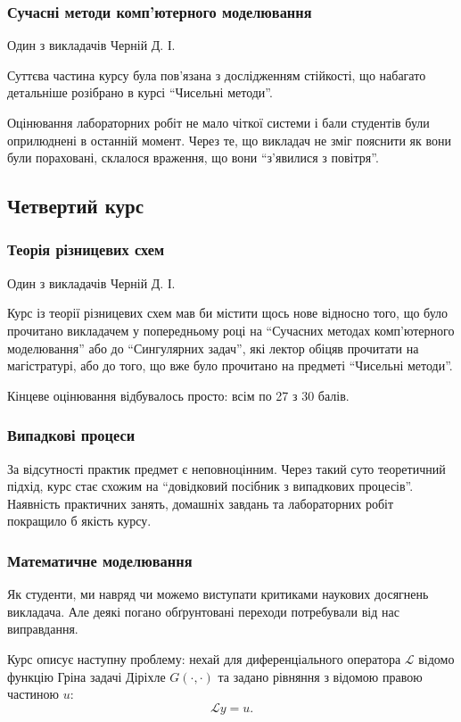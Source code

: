 \documentclass[14pt, a4paper]{extarticle}  %
\begin{document}
\subsubsection{Сучасні методи комп'ютерного моделювання}
Один з викладачів Черній Д. І.

Суттєва частина курсу була пов'язана з дослідженням стійкості, що набагато детальніше розібрано в курсі ``Чисельні методи''.

Оцінювання лабораторних робіт не мало чіткої системи і бали студентів були оприлюднені в останній момент. Через те, що  викладач не зміг пояснити як вони були пораховані, склалося враження, що вони ``з'явилися з повітря''. 

\subsection{Четвертий курс}
\subsubsection{Теорія різницевих схем} 
Один з викладачів Черній Д. І.

Курс із теорії різницевих схем мав би містити щось нове відносно того, що було прочитано викладачем у попередньому році на ``Сучасних методах комп'ютерного моделювання'' або до ``Сингулярних задач'', які лектор обіцяв прочитати на магістратурі, або до того, що вже було прочитано на предметі ``Чисельні методи''. 

Кінцеве оцінювання відбувалось просто: всім по 27 з 30 балів. 

\subsubsection{Випадкові процеси}

За відсутності практик предмет є неповноцінним. Через такий суто теоретичний підхід, курс стає схожим на ``довідковий посібник з випадкових процесів''. Наявність практичних занять, домашніх завдань та лабораторних робіт покращило б якість курсу. 

\subsubsection{Математичне моделювання}
Як студенти, ми навряд чи можемо виступати критиками наукових досягнень викладача. Але деякі погано обґрунтовані переходи потребували від нас виправдання. 

Курс описує наступну проблему: нехай для диференціального оператора $\mathcal{L}$ відомо функцію Гріна задачі Діріхле $G(\cdot, \cdot)$ та задано рівняння з відомою правою частиною $u$:
\[ \mathcal{L} y = u. \]
\end{document}
